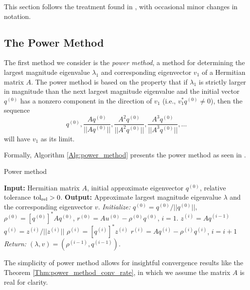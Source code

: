This section follows the treatment found in \cite[Chapters 8, 10]{golub2012matrix}, with occasional minor changes in notation.





\subsection{The Power Method} 			\label{Subsubsec:evol_mats-power_method}


The first method we consider is the \textit{power method}, a method for determining the largest magnitude eigenvalue $\lambda_1$ and corresponding eigenvector $v_1$ of a Hermitian matrix $A$.  The power method is based on the property that if $\lambda_1$ is strictly larger in magnitude than the next largest magnitude eigenvalue and the initial vector $q^{(0)}$ has a nonzero component in the direction of $v_1$ (i.e., $v_1^*q^{(0)} \neq 0$), then the sequence
\[
q^{(0)}, \frac{Aq^{(0)}}{||Aq^{(0)}||},  \frac{A^2q^{(0)}}{||A^2q^{(0)}||},  \frac{A^3q^{(0)}}{||A^3q^{(0)}||}, \ldots
\]
will have $v_1$ as its limit.  

Formally, Algorithm \ref{Alg:power_method} presents the power method as seen in \cite[Section 8.2.1]{golub2012matrix}.

\begin{algorithm}[H]
\caption{Power method}	\label{Alg:power_method}

\begin{algorithmic}[1]
	\Statex 	\textbf{Input:} Hermitian matrix $A$, initial approximate eigenvector $q^{(0)}$, relative tolerance $\textnormal{tol}_\textnormal{rel} > 0$.
	\Statex 	\textbf{Output:} Approximate largest magnitude eigenvalue $\lambda$ and the corresponding eigenvector $v$.
	\State		\textit{Initialize:} $q^{(0)} = q^{(0)}/||q^{(0)}||$, $\rho^{(0)} = [q^{(0)}]^*Aq^{(0)}$, $r^{(0)} = Au^{(0)} - \rho^{(0)}q^{(0)}$, $i= 1$.
		\State		$z^{(i)} = Aq^{(i-1)}$
		\State		$q^{(i)} = z^{(i)} / ||z^{(i)}||$
		\State		$\rho^{(i)} = [q^{(i)}]^* z^{(i)}$
		\State		$r^{(i)} = Aq^{(i)} - \rho^{(i)}q^{(i)}$, $i = i + 1$
	\EndWhile
	\State		\textit{Return:} $(\lambda, v) = (\rho^{(i-1)} , q^{(i-1)})$.
\end{algorithmic}

\end{algorithm}


The simplicity of power method allows for insightful convergence results like the Theorem \ref{Thm:power_method_conv_rate}, in which we assume the matrix $A$ is real for clarity.

